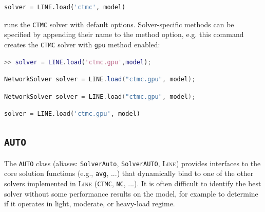 \begin{PYTHON}
\begin{lstlisting}[language=python]
solver = LINE.load('ctmc', model)
\end{lstlisting}
\end{PYTHON}
runs the \texttt{CTMC} solver with default options. Solver-specific methods can be specified by appending their name to the method option, e.g. this command creates the \texttt{CTMC} solver with \texttt{gpu} method enabled:
\begin{MATLAB}
\begin{lstlisting}[language = matlab]
>> solver = LINE.load('ctmc.gpu',model);
\end{lstlisting}
\end{MATLAB}
\begin{JAVA}
\begin{lstlisting}[language=java, basicstyle=\ttfamily\scriptsize]
NetworkSolver solver = LINE.load("ctmc.gpu", model);
\end{lstlisting}
\end{JAVA}
\begin{KOTLIN}
\begin{lstlisting}[language=kotlin, basicstyle=\ttfamily\scriptsize]
NetworkSolver solver = LINE.load("ctmc.gpu", model);
\end{lstlisting}
\end{KOTLIN}
\begin{PYTHON}
\begin{lstlisting}[language=python]
solver = LINE.load('ctmc.gpu', model)
\end{lstlisting}
\end{PYTHON}



\subsection{\texttt{AUTO}}
The \texttt{AUTO} class (aliases: \texttt{SolverAuto}, \texttt{SolverAUTO}, \textsc{Line}) provides interfaces to the core solution functions (e.g., \texttt{avg}, ...) that dynamically bind to one of the other solvers implemented in \textsc{Line} (\texttt{CTMC}, \texttt{NC}, ...). It is often difficult to identify the best solver without some performance results on the model, for example to determine if it operates in light, moderate, or heavy-load regime.

